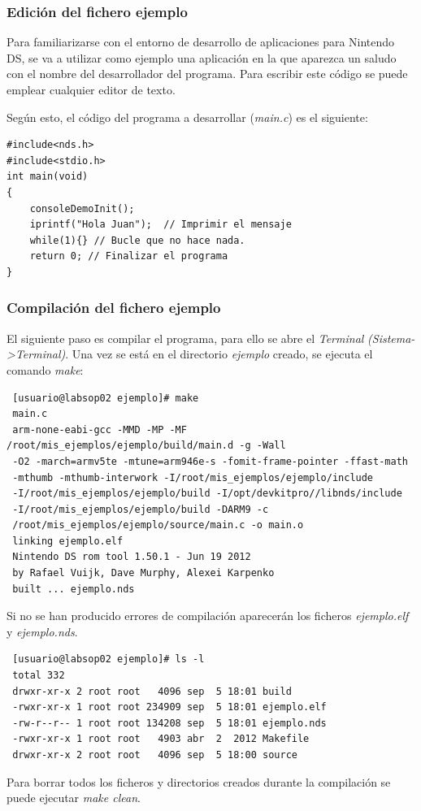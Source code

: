 \subsubsection{Edición del fichero ejemplo}
Para familiarizarse con el entorno de desarrollo de aplicaciones para Nintendo DS, se va a utilizar como ejemplo una aplicación en la que aparezca un saludo con el nombre del desarrollador del programa. Para escribir este código se puede emplear cualquier editor de texto.

Según esto, el código del programa a desarrollar (\textit{main.c}) es el siguiente:
\begin{lstlisting}
#include<nds.h>
#include<stdio.h>
int main(void)
{
	consoleDemoInit();
    iprintf("Hola Juan");  // Imprimir el mensaje 
    while(1){} // Bucle que no hace nada.     
    return 0; // Finalizar el programa
}
\end{lstlisting}

\subsubsection{Compilación del fichero ejemplo}
El siguiente paso es compilar el programa, para ello se abre el \textit{Terminal} \textit{(Sistema->Terminal)}. Una vez se está en el directorio \textit{ejemplo} creado, se ejecuta el comando \textit{make}:
\begin{verbatim}
 [usuario@labsop02 ejemplo]# make
 main.c
 arm-none-eabi-gcc -MMD -MP -MF /root/mis_ejemplos/ejemplo/build/main.d -g -Wall 
 -O2 -march=armv5te -mtune=arm946e-s -fomit-frame-pointer -ffast-math 
 -mthumb -mthumb-interwork -I/root/mis_ejemplos/ejemplo/include 
 -I/root/mis_ejemplos/ejemplo/build -I/opt/devkitpro//libnds/include 
 -I/root/mis_ejemplos/ejemplo/build -DARM9 -c 
 /root/mis_ejemplos/ejemplo/source/main.c -o main.o 
 linking ejemplo.elf
 Nintendo DS rom tool 1.50.1 - Jun 19 2012
 by Rafael Vuijk, Dave Murphy, Alexei Karpenko
 built ... ejemplo.nds
\end{verbatim}

Si no se han producido errores de compilación aparecerán los ficheros  \textit{ejemplo.elf} y \textit{ejemplo.nds}.
\begin{verbatim}
 [usuario@labsop02 ejemplo]# ls -l
 total 332
 drwxr-xr-x 2 root root   4096 sep  5 18:01 build
 -rwxr-xr-x 1 root root 234909 sep  5 18:01 ejemplo.elf
 -rw-r--r-- 1 root root 134208 sep  5 18:01 ejemplo.nds
 -rwxr-xr-x 1 root root   4903 abr  2  2012 Makefile
 drwxr-xr-x 2 root root   4096 sep  5 18:00 source
                \end{verbatim}
Para borrar todos los ficheros y directorios creados durante la compilación se puede ejecutar \textit{make clean}.

